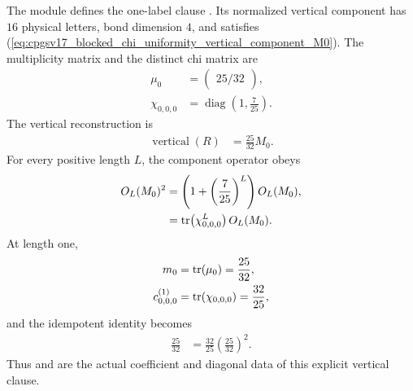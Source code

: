 \documentclass{article}
\begin{document}
The module
 defines the
one-label clause
.
Its normalized vertical component has $16$ physical letters, bond dimension
$4$, and satisfies
(\ref{eq:cpgsv17_blocked_chi_uniformity_vertical_component_M0}). The
multiplicity matrix and the distinct chi matrix are
\begin{align}
    \mu_0
        &= \begin{pmatrix}25/32\end{pmatrix},
\label{eq:cpgsv17_blocked_chi_uniformity_example_multiplicity_matrix}\\
    \chi_{0,0,0}
        &= \operatorname{diag}\!\left(1,\frac7{25}\right).
\label{eq:cpgsv17_blocked_chi_uniformity_example_chi_matrix}
\end{align}
The vertical reconstruction is
\begin{align}
    \operatorname{vertical}(R)
        &= \frac{25}{32}M_0.
\label{eq:cpgsv17_blocked_chi_uniformity_vertical_reconstruction}
\end{align}
For every positive length $L$, the component operator obeys
\begin{align}
    O_L(M_0)^2
        &= \left(1+\left(\frac7{25}\right)^L\right)O_L(M_0),
\label{eq:cpgsv17_blocked_chi_uniformity_example_operator_square}\\
        &= \operatorname{tr}\!\left(\chi_{0,0,0}^{L}\right)O_L(M_0).
\label{eq:cpgsv17_blocked_chi_uniformity_example_operator_chi_trace}
\end{align}
At length one,
\begin{align}
    m_0
        &= \operatorname{tr}(\mu_0)
         = \frac{25}{32},
\label{eq:cpgsv17_blocked_chi_uniformity_example_trace_scalar}\\
    c^{(1)}_{0,0,0}
        &= \operatorname{tr}(\chi_{0,0,0})
         = \frac{32}{25},
\label{eq:cpgsv17_blocked_chi_uniformity_example_length_one_coefficient}
\end{align}
and the idempotent identity becomes
\begin{align}
    \frac{25}{32}
        &= \frac{32}{25}
            \left(\frac{25}{32}\right)^2.
\label{eq:cpgsv17_blocked_chi_uniformity_example_idempotent_identity}
\end{align}
Thus
 and
 are the
actual coefficient and diagonal data of this explicit vertical clause.
\end{document}
